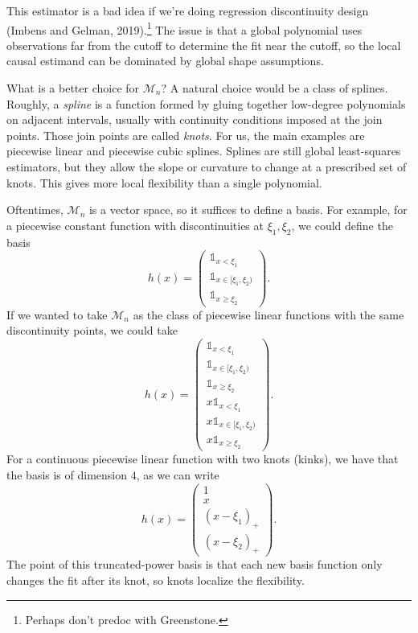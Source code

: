 This estimator is a bad idea if we're doing regression discontinuity design (Imbens and Gelman, 2019).\footnote{Perhaps don't predoc with Greenstone.} The issue is that a global polynomial uses observations far from the cutoff to determine the fit near the cutoff, so the local causal estimand can be dominated by global shape assumptions.

What is a better choice for $\mathscr{M}_n$? A natural choice would be a class of splines.
Roughly, a \emph{spline} is a function formed by gluing together low-degree polynomials on adjacent intervals, usually with continuity conditions imposed at the join points. Those join points are called \emph{knots}. For us, the main examples are piecewise linear and piecewise cubic splines.
Splines are still global least-squares estimators, but they allow the slope or curvature to change at a prescribed set of knots. This gives more local flexibility than a single polynomial.

Oftentimes, $\mathscr{M}_n$ is a vector space, so it suffices to define a basis.
For example, for a piecewise constant function with discontinuities at $\xi_1,\xi_2$, we could define the basis \[
	h(x) = \begin{pmatrix}
	\mathds{1}_{x < \xi_1} \\
	\mathds{1}_{x \in [\xi_1,\xi_2)} \\
	\mathds{1}_{x \ge \xi_2}
	\end{pmatrix} 
.\] If we wanted to take $\mathscr{M}_n$ as the class of piecewise linear functions with the same discontinuity points, we could take \[
	h(x) = \begin{pmatrix}
	\mathds{1}_{x < \xi_1} \\
	\mathds{1}_{x \in [\xi_1,\xi_2)} \\
	\mathds{1}_{x \ge \xi_2} \\

	x\mathds{1}_{x < \xi_1} \\
	x\mathds{1}_{x \in [\xi_1,\xi_2)} \\
	x\mathds{1}_{x \ge \xi_2}
	\end{pmatrix} 
.\] 
For a continuous piecewise linear function with two knots (kinks), we have that the basis is of dimension $4$, as we can write \[
		h(x) = 
		\begin{pmatrix}
		1 \\
		x \\
		\left( x-\xi_1 \right)_{+} \\
		\left( x-\xi_2 \right)_+
		\end{pmatrix} 
	.\] 
The point of this truncated-power basis is that each new basis function only changes the fit after its knot, so knots localize the flexibility.

